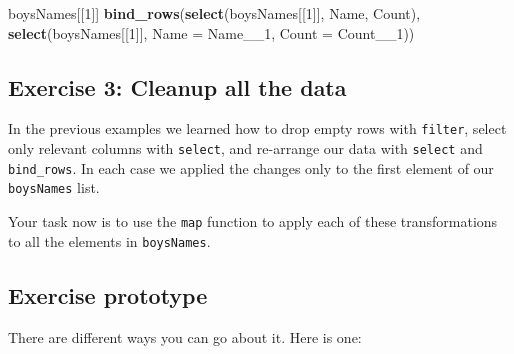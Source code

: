 \documentclass[]{book}
\newenvironment{Shaded}{\begin{snugshade}}{\end{snugshade}}
\newcommand{\KeywordTok}[1]{\textcolor[rgb]{0.13,0.29,0.53}{\textbf{#1}}}
\newcommand{\DataTypeTok}[1]{\textcolor[rgb]{0.13,0.29,0.53}{#1}}
\newcommand{\DecValTok}[1]{\textcolor[rgb]{0.00,0.00,0.81}{#1}}
\newcommand{\NormalTok}[1]{#1}
\begin{document}
\begin{Shaded}
\begin{Highlighting}[]
\NormalTok{boysNames[[}\DecValTok{1}\NormalTok{]]}
\KeywordTok{bind_rows}\NormalTok{(}\KeywordTok{select}\NormalTok{(boysNames[[}\DecValTok{1}\NormalTok{]], Name, Count),}
          \KeywordTok{select}\NormalTok{(boysNames[[}\DecValTok{1}\NormalTok{]], }\DataTypeTok{Name =}\NormalTok{ Name__}\DecValTok{1}\NormalTok{, }\DataTypeTok{Count =}\NormalTok{ Count__}\DecValTok{1}\NormalTok{))}
\end{Highlighting}
\end{Shaded}

\subsection{Exercise 3: Cleanup all the
data}\label{exercise-3-cleanup-all-the-data}

In the previous examples we learned how to drop empty rows with
\texttt{filter}, select only relevant columns with \texttt{select}, and
re-arrange our data with \texttt{select} and \texttt{bind\_rows}. In
each case we applied the changes only to the first element of our
\texttt{boysNames} list.

Your task now is to use the \texttt{map} function to apply each of these
transformations to all the elements in \texttt{boysNames}.

\subsection{Exercise prototype}\label{exercise-prototype}

There are different ways you can go about it. Here is one:
\end{document}
